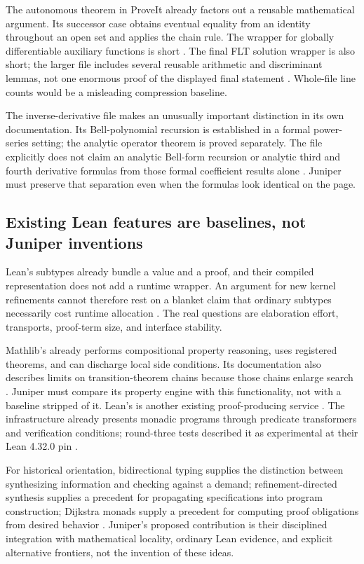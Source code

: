 \documentclass[11pt,a4paper]{article}
\newcommand{\code}[1]{\texttt{\small\detokenize{#1}}}
\theoremstyle{definition}\newtheorem{definition}[theorem]{Definition}
\theoremstyle{remark}\newtheorem{remark}[theorem]{Remark}
\begin{document}
The autonomous theorem in ProveIt already factors out a reusable mathematical argument. Its successor case obtains eventual equality from an identity throughout an open set and applies the chain rule. The wrapper for globally differentiable auxiliary functions is short \cite{ode}. The final FLT solution wrapper is also short; the larger file includes several reusable arithmetic and discriminant lemmas, not one enormous proof of the displayed final statement \cite{freyMap}. Whole-file line counts would be a misleading compression baseline.

The inverse-derivative file makes an unusually important distinction in its own documentation. Its Bell-polynomial recursion is established in a formal power-series setting; the analytic operator theorem is proved separately. The file explicitly does not claim an analytic Bell-form recursion or analytic third and fourth derivative formulas from those formal coefficient results alone \cite{inverse}. Juniper must preserve that separation even when the formulas look identical on the page.

\subsection{Existing Lean features are baselines, not Juniper inventions}
Lean's subtypes already bundle a value and a proof, and their compiled representation does not add a runtime wrapper. An argument for new kernel refinements cannot therefore rest on a blanket claim that ordinary subtypes necessarily cost runtime allocation \cite{leanSubtype,leanRuntime}. The real questions are elaboration effort, transports, proof-term size, and interface stability.

Mathlib's \code{fun_prop} already performs compositional property reasoning, uses registered theorems, and can discharge local side conditions. Its documentation also describes limits on transition-theorem chains because those chains enlarge search \cite{funprop}. Juniper must compare its property engine with this functionality, not with a baseline stripped of it. Lean's \code{grind} is another existing proof-producing service \cite{grind}. The \code{mvcgen} infrastructure already presents monadic programs through predicate transformers and verification conditions; round-three tests described it as experimental at their Lean 4.32.0 pin \cite{mvcgen,synA,synB}.

For historical orientation, bidirectional typing supplies the distinction between synthesizing information and checking against a demand; refinement-directed synthesis supplies a precedent for propagating specifications into program construction; Dijkstra monads supply a precedent for computing proof obligations from desired behavior \cite{bidir,synquid,dmfree}. Juniper's proposed contribution is their disciplined integration with mathematical locality, ordinary Lean evidence, and explicit alternative frontiers, not the invention of these ideas.
\end{document}
